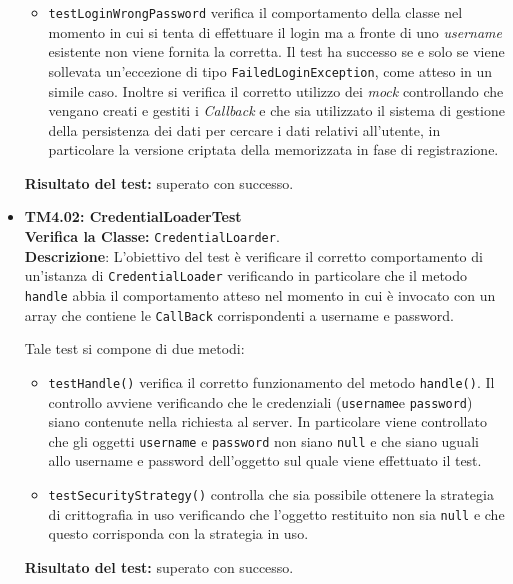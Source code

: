 \begin{itemize}
\begin{itemize}
\item \texttt{testLoginWrongPassword} verifica il comportamento della classe nel momento in cui si tenta di effettuare il login ma a fronte di uno \textit{username} esistente non viene fornita la  corretta. Il test ha successo se e solo se viene sollevata un'eccezione di tipo \texttt{FailedLoginException}, come atteso in un simile caso. Inoltre si verifica il corretto utilizzo dei \textit{mock} controllando che vengano creati e gestiti i \textit{Callback} e che sia utilizzato il sistema di gestione della persistenza dei dati per cercare i dati relativi all'utente, in particolare la versione criptata della  memorizzata in fase di registrazione.
\end{itemize}

\textbf{Risultato del test:} superato con successo.


\item \textbf{TM4.02: CredentialLoaderTest}\\
\textbf{Verifica la Classe:} \texttt{CredentialLoarder}.\\
\textbf{Descrizione}: L'obiettivo del test è verificare il corretto comportamento di un'istanza di \texttt{CredentialLoader} verificando in particolare che il metodo \texttt{handle} abbia il comportamento atteso nel momento in cui è invocato con un array che contiene le \texttt{CallBack} corrispondenti a username e password.

Tale test si compone di due metodi:
\begin{itemize}

\item \texttt{testHandle()} verifica il corretto funzionamento del metodo \texttt{handle()}. Il controllo avviene verificando che le credenziali (\texttt{username}e \texttt{password}) siano contenute nella richiesta al server. In particolare viene controllato che gli oggetti \texttt{username} e \texttt{password} non siano \texttt{null} e che siano uguali allo username e password dell'oggetto sul quale viene effettuato il test.

\item \texttt{testSecurityStrategy()} controlla che sia possibile ottenere la strategia di crittografia in uso verificando che l'oggetto restituito non sia \texttt{null} e che questo corrisponda con la strategia in uso.

\end{itemize}
\textbf{Risultato del test:} superato con successo.


\end{itemize}
